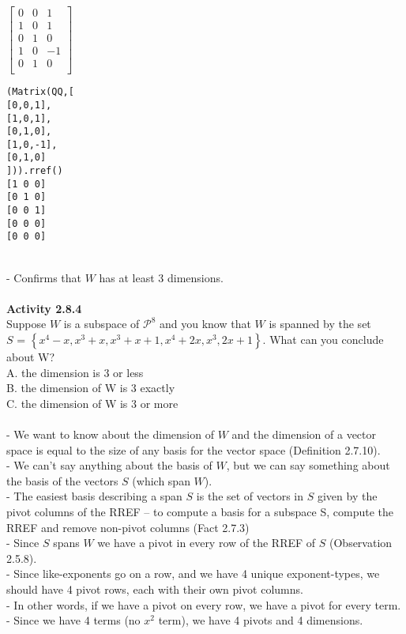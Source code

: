 \documentclass{article}
\begin{document}
{$\left[ \begin{matrix} 
0 & 0 & 1\\
1 & 0 & 1\\
0 & 1 & 0\\
1 &0 &-1\\
0 &1& 0 \\
\end{matrix} \right]$
\begin{verbatim}
(Matrix(QQ,[
[0,0,1],
[1,0,1],
[0,1,0],
[1,0,-1],
[0,1,0]
])).rref()
[1 0 0]
[0 1 0]
[0 0 1]
[0 0 0]
[0 0 0]
\end{verbatim}\\
- Confirms that $W$ has at least 3 dimensions.\\
\\
\noindent \textbf{Activity 2.8.4} \\
Suppose $W$ is a subspace of $\mathcal{P}^{8}$ and you know that $W$ is spanned by the set\\
$S$ = $\left\{ x^{4} -x, x^{3} + x, x^{3} + x + 1, x^{4} + 2x, x^{3}, 2x + 1 \right\}$. What can you conclude about W?\\
A. the dimension is 3 or less\\
B. the dimension of W is 3 exactly\\
C. the dimension of W is 3 or more\\
\\
- We want to know about the dimension of $W$ and the dimension of a vector space is equal to the size of any basis for the vector space (Definition 2.7.10).\\
- We can't say anything about the basis of $W$, but we can say something about the basis of the vectors $S$ (which span $W$).\\
- The easiest basis describing a span $S$ is the set of vectors in $S$ given by the pivot columns of the RREF -- to compute a basis for a subspace S, compute the RREF and remove non-pivot columns (Fact 2.7.3) \\
- Since $S$ spans $W$ we have a pivot in every row of the RREF of $S$ (Observation 2.5.8).\\
- Since like-exponents go on a row, and we have 4 unique exponent-types, we should have 4 pivot rows, each with their own pivot columns.\\
- In other words, if we have a pivot on every row, we have a pivot for every term.\\
- Since we have 4 terms (no $x^{2}$ term), we have 4 pivots and 4 dimensions.\\
\\
}
\end{document}
